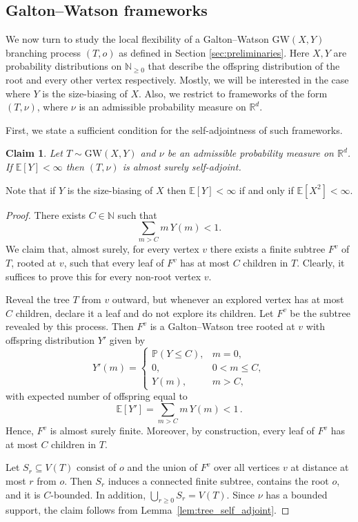 \documentclass[10pt,a4paper]{amsart}
\numberwithin{equation}{section}
\newtheorem{claim}[theorem]{Claim}
\newcommand{\E}{\mathbb E}
\newcommand{\N}{\mathbb N}
\renewcommand{\P}{\mathbb P}
\newcommand{\R}{\mathbb R}
\begin{document}
\subsection{Galton--Watson frameworks}
\label{sec:GW}
We now turn to study the local flexibility of a Galton--Watson $\mathrm{GW}(X,Y)$ branching process $(T,o)$ as defined in Section \ref{sec:preliminaries}.
Here $X,Y$ are probability distributions on $\N_{\ge 0}$ that describe the offspring distribution of the root and every other vertex respectively.
Mostly, we will be interested in the case where $Y$ is the size-biasing of $X$. Also, we restrict to frameworks of the form $(T,\nu)$, where $\nu$ is an admissible probability measure on $\R^d$. 

First, we state a sufficient condition for the self-adjointness of such frameworks.
\begin{claim}\label{clm:GWSA}
    Let $T\sim\mathrm{GW}(X,Y)$ and $\nu$ be an admissible probability measure on $\R^d$. 
    If $\E[Y]<\infty$ then $(T,\nu)$ is almost surely self-adjoint.
\end{claim}
Note that if $Y$ is the size-biasing of $X$ then $\E[Y]<\infty$ if and only if $\E[X^2]<\infty$.
\begin{proof}
There exists $C\in\N$ such that
\begin{equation}\label{eq:chooseC}
\sum_{m>C} m\,Y(m)<1.
\end{equation}
We claim that, almost surely, for every vertex $v$ there exists a finite subtree $F^v$ of $T$, rooted at $v$, such that every leaf of $F^v$
has at most $C$ children in $T$. Clearly, it suffices to prove this for every non-root vertex $v$.

Reveal the tree $T$ from $v$ outward, but whenever an explored vertex has at most $C$ children, declare it a leaf and do not explore its children.
Let $F^v$ be the subtree revealed by this process. Then $F^v$ is a Galton--Watson tree rooted at $v$ with offspring distribution $Y'$ given by
\[
Y'(m)=
\begin{cases}
\P(Y\le C), & m=0,\\
0, & 0<m\le C,\\
Y(m), & m>C,
\end{cases}
\]
with expected number of offspring equal to
\[
\E[Y']=\sum_{m>C} m\,Y(m)<1\,.
\]
Hence, $F^v$ is almost surely finite. Moreover, by construction, every leaf of $F^v$ has at most $C$ children in $T$.

Let $S_r\subseteq V(T)$ consist of $o$ and the union of $F^v$ over all vertices $v$ at distance at most $r$ from $o$.
Then $S_r$ induces a connected finite subtree, contains the root $o$, and it is $C$-bounded. In addition, $\bigcup_{r\ge 0} S_r=V(T)$.
Since $\nu$ has a bounded support, the claim follows from Lemma~\ref{lem:tree_self_adjoint}.
\end{proof}
\end{document}

